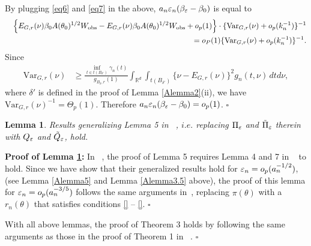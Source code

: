 \documentclass{article}
\newtheorem{lemma}{Lemma}
\begin{document}
	By plugging \eqref{eq6} and \eqref{eq7} in the above, $a_{n}\varepsilon_{n}(\beta_{\varepsilon}-\beta_{0})$
	is equal to 
	\begin{eqnarray*}
		&  & \left\{ E_{G,r}(\nu)\beta_{0}A(\theta_{0})^{1/2}W_{\rm obs}-E_{G,r}(\nu)\beta_{0}A(\theta_{0})^{1/2}W_{\rm obs}+o_{p}(1)\right\} \cdot%
		\{\text{Var}_{G,r}(\nu)+o_{p}(k_{n}^{-1})\}^{-1}\\
		&&\hspace{1cm} = o_{P}(1)\{\text{Var}_{G,r}(\nu)+o_{p}(k_{n}^{-1})\}^{-1}.
	\end{eqnarray*}
	Since
	\begin{align*}
	\text{Var}_{G,r}(\nu) & \geq\frac{\inf_{t\in t(B_{\delta'})}\gamma_{n}(t)}{g_{B_{\delta},r}(1)}\int_{\mathbb{R}^{d}}\int_{t(B_{\delta'})}\{\nu-E_{G,r}(\nu)\}^{2}g_{n}(t,\nu)\,dtd\nu,
	\end{align*}
	where $\delta'$ is defined in the proof of Lemma \ref{Alemma2}(ii),
	we have $\text{Var}_{G,r}(\nu)^{-1}=\Theta_{p}(1)$. Therefore $a_{n}\varepsilon_{n}(\beta_{\varepsilon}-\beta_{0})=o_{p}(1)$.
	\hfill{$\square$} 

\pagebreak 
\begin{lemma}\label{Alemma6} Results generalizing Lemma 5 in ~\cite{Li2017},
	$i.e.$ replacing $\Pi_{\varepsilon}$ and $\tilde{\Pi}_{\varepsilon}$ therein with
	$Q_{\varepsilon}$ and $\tilde{Q}_{\varepsilon}$, hold. \end{lemma} 
{\bf Proof of Lemma \ref{Alemma6}:} 
	In ~\cite{Li2017}, the proof of Lemma 5 requires Lemma 4 and 7 in ~\cite{Li2017} to hold. Since we have show that their generalized results hold for $\varepsilon_{n}=o_{p}(a_{n}^{-1/2})$, (see Lemma \ref{Alemma5} and Lemma \ref{Alemma3.5} above),
    the proof of this lemma for $\varepsilon_{n}=o_{p}(a_{n}^{-3/5})$ follows the same arguments in~\cite{Li2017}, replacing $\pi(\theta)$ with a $r_n(\theta)$ that satisfies conditions \ref{} -- \ref{}.
	\hfill{$\square$} 


With all above lemmas, the proof of Theorem 3 holds by following the same arguments as those in the proof of Theorem 1 in ~\cite{Li2017}.
	\hfill{$\square$} 

	

	
\end{document}
